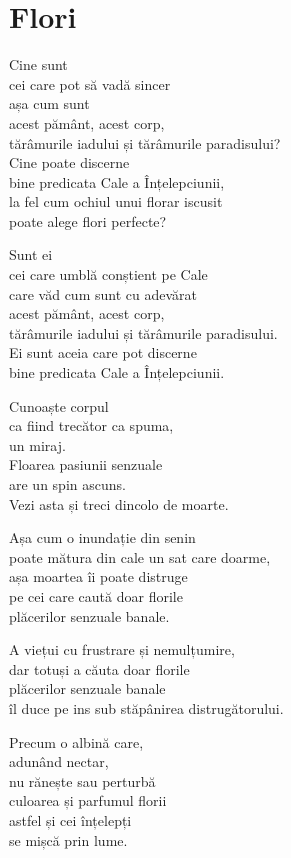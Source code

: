 
\chapter{Flori}


Cine sunt\\
cei care pot să vadă sincer\\
așa cum sunt\\
acest pământ, acest corp,\\
tărâmurile iadului și tărâmurile paradisului?\\
Cine poate discerne\\
bine predicata Cale a Înțelepciunii,\\
la fel cum ochiul unui florar iscusit\\
poate alege flori perfecte?

Sunt ei\\
cei care umblă conștient pe Cale\\
care văd cum sunt cu adevărat\\
acest pământ, acest corp,\\
tărâmurile iadului și tărâmurile paradisului.\\
Ei sunt aceia care pot discerne\\
bine predicata Cale a Înțelepciunii.


Cunoaște corpul\\
ca fiind trecător ca spuma,\\
un miraj.\\
Floarea pasiunii senzuale\\
are un spin ascuns.\\
Vezi asta și treci dincolo de moarte.


Așa cum o inundație din senin\\
poate mătura din cale un sat care doarme,\\
așa moartea îi poate distruge\\
pe cei care caută doar florile\\
plăcerilor senzuale banale.


A viețui cu frustrare și nemulțumire,\\
dar totuși a căuta doar florile\\
plăcerilor senzuale banale\\
îl duce pe ins sub stăpânirea distrugătorului.


Precum o albină care,\\
adunând nectar,\\
nu rănește sau perturbă\\
culoarea și parfumul florii\\
astfel și cei înțelepți\\
se mișcă prin lume.


